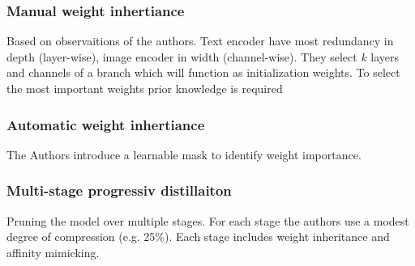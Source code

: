         \subsubsection{Manual weight inhertiance}
        Based on observaitions of the authors.
        Text encoder have most redundancy in depth (layer-wise), image encoder in width (channel-wise).
        They select \(k\) layers and channels of a branch which will function as initialization weights.
        To select the most important weights prior knowledge is required

        \subsubsection{Automatic weight inhertiance}
        The Authors introduce a learnable mask to identify weight importance.

        \subsubsection{Multi-stage progressiv distillaiton}
        Pruning the model over multiple stages.
        For each stage the authors use a modest degree of compression (e.g. 25\%). Each stage includes weight inheritance and affinity mimicking.





